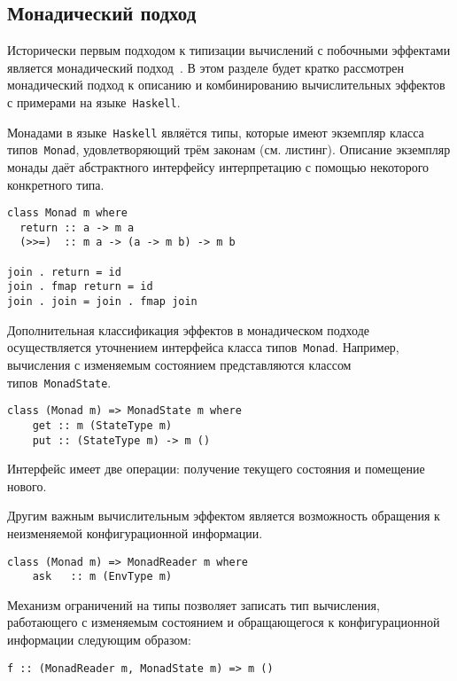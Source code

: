 \documentclass [a4paper] {article}
\begin{document}
\subsection{Монадический подход}

Исторически первым подходом к типизации вычислений с побочными эффектами
является монадический подход~\cite{Moggi:1989:CLM:77350.77353}. В этом разделе
будет кратко рассмотрен монадический подход к описанию и комбинированию
вычислительных эффектов с примерами на языке~\texttt{Haskell}.

Монадами в языке~\texttt{Haskell} являётся типы, которые имеют экземпляр
класса типов~\texttt{Monad}, удовлетворяющий трём законам
(см. листинг). Описание экземпляр монады даёт абстрактного интерфейсу
интерпретацию с помощью некоторого конкретного типа.

\begin{verbatim}
class Monad m where
  return :: a -> m a
  (>>=)  :: m a -> (a -> m b) -> m b

join . return = id
join . fmap return = id
join . join = join . fmap join
\end{verbatim}

Дополнительная классификация эффектов в монадическом подходе осуществляется
уточнением интерфейса класса типов~\texttt{Monad}. Например, вычисления с
изменяемым состоянием представляются классом типов~\texttt{MonadState}.

\begin{verbatim}
class (Monad m) => MonadState m where
    get :: m (StateType m)
    put :: (StateType m) -> m ()
\end{verbatim}

Интерфейс имеет две операции: получение текущего состояния и помещение
нового.

Другим важным вычислительным эффектом является возможность обращения к
неизменяемой конфигурационной информации.

\begin{verbatim}
class (Monad m) => MonadReader m where
    ask   :: m (EnvType m)
\end{verbatim}

Механизм ограничений на типы позволяет записать тип вычисления, работающего
с изменяемым состоянием и обращающегося к конфигурационной информации следующим
образом:

\begin{verbatim}
f :: (MonadReader m, MonadState m) => m ()
\end{verbatim}
\end{document}
